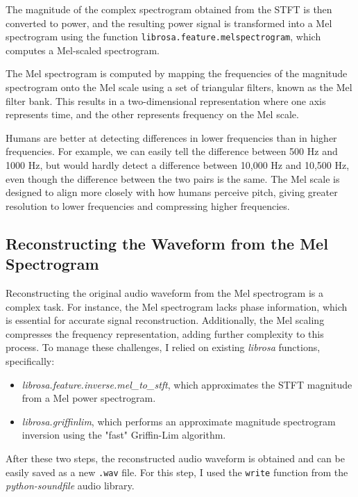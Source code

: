 \documentclass[12pt]{article}
\begin{document}
The magnitude of the complex spectrogram obtained from the STFT is then converted to power, and the resulting power signal is transformed into a Mel spectrogram using the function \texttt{librosa.feature.melspectrogram}, which computes a Mel-scaled spectrogram.

The Mel spectrogram is computed by mapping the frequencies of the magnitude spectrogram onto the Mel scale using a set of triangular filters, known as the Mel filter bank. This results in a two-dimensional representation where one axis represents time, and the other represents frequency on the Mel scale.

Humans are better at detecting differences in lower frequencies than in higher frequencies. For example, we can easily tell the difference between 500 Hz and 1000 Hz, but would hardly detect a difference between 10,000 Hz and 10,500 Hz, even though the difference between the two pairs is the same. The Mel scale is designed to align more closely with how humans perceive pitch, giving greater resolution to lower frequencies and compressing higher frequencies.


\subsection{Reconstructing the Waveform from the Mel Spectrogram}

Reconstructing the original audio waveform from the Mel spectrogram is a complex task. For instance, the Mel spectrogram lacks phase information, which is essential for accurate signal reconstruction. Additionally, the Mel scaling compresses the frequency representation, adding further complexity to this process. To manage these challenges, I relied on existing \textit{librosa} functions, specifically:

\begin{itemize}
    \item \textit{librosa.feature.inverse.mel\_to\_stft}, which approximates the STFT magnitude from a Mel power spectrogram.
    \item \textit{librosa.griffinlim}, which performs an approximate magnitude spectrogram inversion using the "fast" Griffin-Lim algorithm.
\end{itemize}

After these two steps, the reconstructed audio waveform is obtained and can be easily saved as a new \texttt{.wav} file. For this step, I used the \texttt{write} function from the \textit{python-soundfile} audio library.
\end{document}
